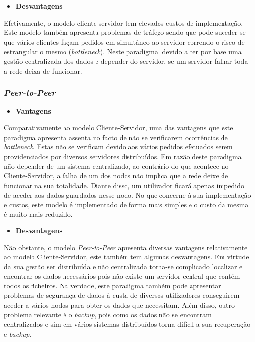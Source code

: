 \documentclass[a4paper, 11pt]{article}
\begin{document}
\begin{itemize}
  \item \textbf{Desvantagens}
\end{itemize}

Efetivamente, o modelo cliente-servidor tem elevados custos de implementação. Este modelo também apresenta problemas de tráfego sendo que pode suceder-se que vários clientes façam pedidos em simultâneo ao servidor correndo o risco de estrangular o mesmo (\textit{bottleneck}). Neste paradigma, devido a ter por base uma gestão centralizada dos dados e depender do servidor, se um servidor falhar toda a rede deixa de funcionar.

\clearpage

\subsubsection{\textit{Peer-to-Peer}}

\begin{itemize}
  \item \textbf{Vantagens}
\end{itemize}

Comparativamente ao modelo Cliente-Servidor, uma das vantagens que este paradigma apresenta assenta no facto de não se verificarem ocorrências de \textit{bottleneck}. Estas não se verificam devido aos vários pedidos efetuados serem providenciados por diversos servidores distribuídos. Em razão deste paradigma não depender de um sistema centralizado, ao contrário do que acontece no Cliente-Servidor, a falha de um dos nodos não implica que a rede deixe de funcionar na sua totalidade. Diante disso, um utilizador ficará apenas impedido de aceder aos dados guardados nesse nodo. No que concerne à sua implementação e custos, este modelo é implementado de forma mais simples e o custo da mesma é muito mais reduzido.

\begin{itemize}
  \item \textbf{Desvantagens}
\end{itemize}

Não obstante, o modelo \textit{Peer-to-Peer} apresenta diversas vantagens relativamente ao modelo Cliente-Servidor, este também tem algumas desvantagens.  Em virtude da sua gestão ser distribuída e não centralizada torna-se complicado localizar e encontrar os dados necessários pois não existe um servidor central que contém todos os ficheiros. Na verdade, este paradigma também pode apresentar problemas de segurança de dados à custa de diversos utilizadores conseguirem aceder a vários nodos para obter os dados que necessitam. Além disso, outro problema relevante é o \textit{backup}, pois como os dados não se encontram centralizados e sim em vários sistemas distribuídos torna difícil a sua recuperação e \textit{backup}.
\end{document}
